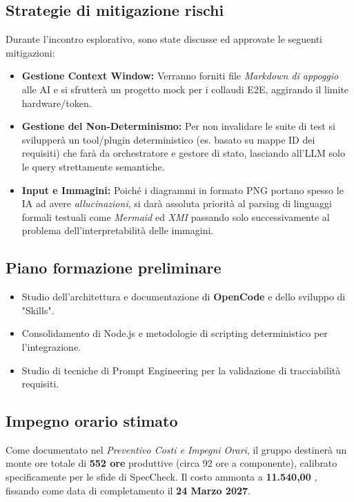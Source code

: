 \documentclass[a4paper, 11pt]{article}
\begin{document}
\subsection{Strategie di mitigazione rischi}
Durante l'incontro esplorativo, sono state discusse ed approvate le seguenti mitigazioni:
\begin{itemize}[label=-]
    \item \textbf{Gestione Context Window:} Verranno forniti file \textit{Markdown di appoggio} alle AI e si sfrutterà un progetto mock per i collaudi E2E, aggirando il limite hardware/token.
    \item \textbf{Gestione del Non-Determinismo:} Per non invalidare le suite di test si svilupperà un tool/plugin deterministico (es. basato su mappe ID dei requisiti) che farà da orchestratore e gestore di stato, lasciando all'LLM solo le query strettamente semantiche.
    \item \textbf{Input e Immagini:} Poiché i diagrammi in formato PNG portano spesso le IA ad avere \textit{allucinazioni}, si darà assoluta priorità al parsing di linguaggi formali testuali come \textit{Mermaid} ed \textit{XMI} passando solo successivamente al problema dell'interpretabilità delle immagini.
\end{itemize}

\subsection{Piano formazione preliminare}
\begin{itemize}[label=-]
    \item Studio dell'architettura e documentazione di \textbf{OpenCode} e dello sviluppo di "Skills".
    \item Consolidamento di Node.js e metodologie di scripting deterministico per l'integrazione.
    \item Studio di tecniche di Prompt Engineering per la validazione di tracciabilità requisiti.
\end{itemize}

\subsection{Impegno orario stimato}
Come documentato nel \textit{Preventivo Costi e Impegni Orari}, il gruppo destinerà un monte ore totale di \textbf{552 ore} produttive (circa 92 ore a componente), calibrato specificamente per le sfide di SpecCheck. Il costo ammonta a \textbf{11.540,00 \texteuro}, fissando come data di completamento il \textbf{24 Marzo 2027}.
\end{document}
